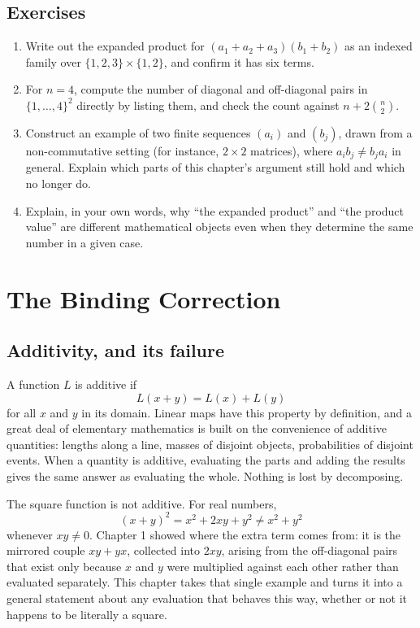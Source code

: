 \documentclass[11pt]{book}
\begin{document}
\section*{Exercises}
\begin{enumerate}
\item Write out the expanded product for $(a_1+a_2+a_3)(b_1+b_2)$ as an indexed family over $\{1,2,3\}\times\{1,2\}$, and confirm it has six terms.
\item For $n=4$, compute the number of diagonal and off-diagonal pairs in $\{1,\ldots,4\}^2$ directly by listing them, and check the count against $n+2\binom{n}{2}$.
\item Construct an example of two finite sequences $(a_i)$ and $(b_j)$, drawn from a non-commutative setting (for instance, $2\times2$ matrices), where $a_ib_j \ne b_ja_i$ in general. Explain which parts of this chapter's argument still hold and which no longer do.
\item Explain, in your own words, why ``the expanded product'' and ``the product value'' are different mathematical objects even when they determine the same number in a given case.
\end{enumerate}

\chapter{The Binding Correction}

\section{Additivity, and its failure}

A function $L$ is additive if
\[
L(x+y) = L(x) + L(y)
\]
for all $x$ and $y$ in its domain. Linear maps have this property by definition, and a great deal of elementary mathematics is built on the convenience of additive quantities: lengths along a line, masses of disjoint objects, probabilities of disjoint events. When a quantity is additive, evaluating the parts and adding the results gives the same answer as evaluating the whole. Nothing is lost by decomposing.

The square function is not additive. For real numbers,
\[
(x+y)^2 = x^2+2xy+y^2 \ne x^2+y^2
\]
whenever $xy \ne 0$. Chapter 1 showed where the extra term comes from: it is the mirrored couple $xy+yx$, collected into $2xy$, arising from the off-diagonal pairs that exist only because $x$ and $y$ were multiplied against each other rather than evaluated separately. This chapter takes that single example and turns it into a general statement about any evaluation that behaves this way, whether or not it happens to be literally a square.
\end{document}
